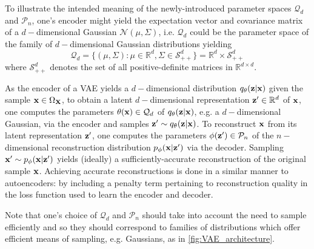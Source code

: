 \documentclass[11pt]{article}
\begin{document}
To illustrate the intended meaning of the newly-introduced parameter spaces $\mathcal{Q}_d$ and $\mathcal{P}_n$, one's encoder might yield the expectation vector and covariance matrix of a $d-$dimensional Gaussian $\mathcal{N}(\mu,\Sigma)$, i.e. $\mathcal{Q}_d$ could be the parameter space of the family of $d-$dimensional Gaussian distributions yielding
$$
\mathcal{Q}_d
=
\{
(\mu,\Sigma):\mu\in\mathbb{R}^d, \Sigma\in\mathcal{S}_{++}^d
\}
=
\mathbb{R}^d\times\mathcal{S}_{++}^d
$$
where $\mathcal{S}_{++}^d$ denotes the set of all positive-definite matrices in $\mathbb{R}^{d\times d}$.

As the encoder of a VAE yields a $d-$dimensional distribution $q_{\theta}(\mathbf{z}|\mathbf{x})$ given the sample $\mathbf{x}\in\Omega_{\mathbf{X}}$, to obtain a latent $d-$dimensional representation $\mathbf{z}'\in\mathbb{R}^d$ of $\mathbf{x}$, one computes the parameters $\theta(\mathbf{x})\in\mathcal{Q}_d$ of $q_{\theta}(\mathbf{z}|\mathbf{x})$, e.g. a $d-$dimensional Gaussian, via the encoder and samples $\mathbf{z}'\sim q_{\theta}(\mathbf{z}|\mathbf{x})$. To reconstruct $\mathbf{x}$ from its latent representation $\mathbf{z}'$, one computes the parameters $\phi(\mathbf{z}')\in\mathcal{P}_n$ of the $n-$dimensional reconstruction distribution $p_{\phi}(\mathbf{x}|\mathbf{z}')$ via the decoder. Sampling $\mathbf{x}'\sim p_{\phi}(\mathbf{x}|\mathbf{z}')$ yields (ideally) a sufficiently-accurate reconstruction of the original sample $\mathbf{x}$. Achieving accurate reconstructions is done in a similar manner to autoencoders: by including a penalty term pertaining to reconstruction quality in the loss function used to learn the encoder and decoder.

Note that one's choice of $\mathcal{Q}_d$ and $\mathcal{P}_n$ should take into account the need to sample efficiently and so they should correspond to families of distributions which offer efficient means of sampling, e.g. Gaussians, as in \autoref{fig:VAE_architecture}.
\end{document}
